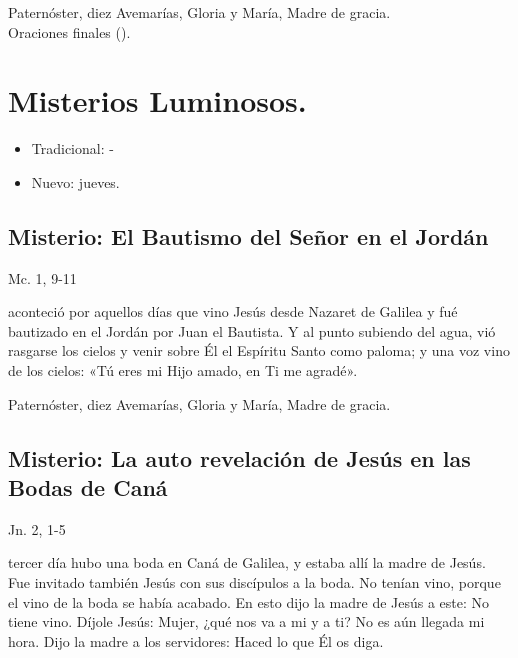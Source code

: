 \documentclass[./main.tex]{subfiles}
\newcounter{lux-counter}
\begin{document}
\begin{center}
      Paternóster, diez Avemarías, Gloria y María, Madre de gracia.\\
      Oraciones finales ().
\end{center}

\section*{Misterios Luminosos.}
\begin{itemize}
      \item Tradicional: -
      \item Nuevo: jueves.
\end{itemize}

\subsection*{ Misterio: El Bautismo del Señor en el Jordán}
\begin{flushright}
      {\color{red}Mc. 1, 9-11}
\end{flushright}
 aconteció por aquellos días que vino Jesús desde Nazaret de Galilea y fué bautizado en el Jordán por Juan el Bautista. 
Y al punto subiendo del agua, vió rasgarse los cielos y venir sobre Él el Espíritu Santo como paloma; y una voz vino de los cielos: 
«Tú eres mi Hijo amado, en Ti me agradé».

\begin{center}
      Paternóster, diez Avemarías, Gloria y María, Madre de gracia.
\end{center}

\subsection*{ Misterio: La auto revelación de Jesús en las Bodas de Caná}
\begin{flushright}
      {\color{red}Jn. 2, 1-5}
\end{flushright}
 tercer día hubo una boda en Caná de Galilea, y estaba allí la madre de Jesús. Fue invitado también Jesús con sus discípulos a la boda. 
No tenían vino, porque el vino de la boda se había acabado. En esto dijo la madre de Jesús a este: No tiene vino. Díjole Jesús: Mujer, 
¿qué nos va a mi y a ti? No es aún llegada mi hora. Dijo la madre a los servidores: Haced lo que Él os diga.
\end{document}
